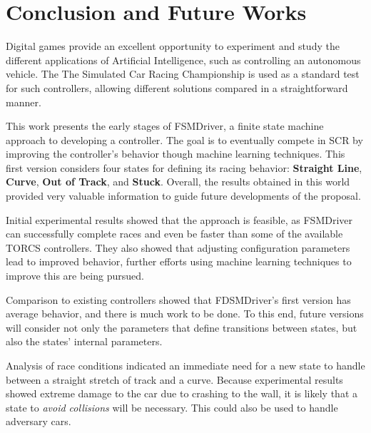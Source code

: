 \section{Conclusion and Future Works}\label{sec:conclusions}
Digital games provide an excellent opportunity to experiment and study the 
different applications of Artificial Intelligence, such as controlling an autonomous
vehicle. The The Simulated Car Racing Championship is used as a standard test for 
such controllers, allowing different solutions compared in a straightforward manner.

This work presents the early stages of FSMDriver, a finite state machine approach
to developing a controller. The goal is to eventually compete in SCR by improving
the controller's behavior though machine learning techniques. This first version
considers four states for defining its racing behavior: \textbf{Straight Line}, 
\textbf{Curve}, \textbf{Out of Track}, and \textbf{Stuck}. Overall, the results
obtained in this world provided very valuable information to guide future 
developments of the proposal.

Initial experimental results showed that the approach is feasible, as FSMDriver
can successfully complete races and even be faster than some of the available
TORCS controllers. They also showed that adjusting configuration parameters lead 
to improved behavior, further efforts using machine learning techniques to 
improve this are being pursued.

Comparison to existing controllers showed that FDSMDriver's first version has 
average behavior, and there is much work to be done. To this end, future versions
will consider not only the parameters that define transitions between states, but
also the states' internal parameters.

Analysis of race conditions indicated an immediate need for a new state to handle 
between a straight stretch of track and a curve. Because experimental results 
showed extreme damage to the car due to crashing to the wall, it is likely that 
a state to \emph{avoid collisions} will be necessary. This could also be used to 
handle adversary cars.